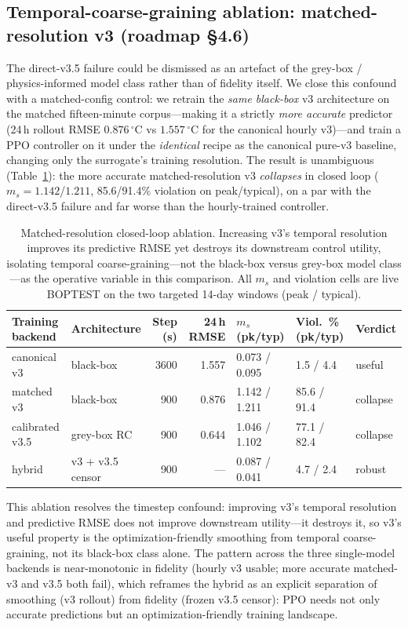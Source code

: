 \documentclass[11pt,a4paper]{article}
\begin{document}
\subsection{Temporal-coarse-graining ablation: matched-resolution v3 (roadmap \S4.6)}
\label{ssec:coarse-graining}

The direct-v3.5 failure could be dismissed as an artefact of the grey-box / physics-informed model class rather than of fidelity itself. We close this confound with a matched-config control: we retrain the \emph{same black-box} v3 architecture on the matched fifteen-minute corpus---making it a strictly \emph{more accurate} predictor (24\,h rollout RMSE $0.876\,^\circ$C vs $1.557\,^\circ$C for the canonical hourly v3)---and train a PPO controller on it under the \emph{identical} recipe as the canonical pure-v3 baseline, changing only the surrogate's training resolution. The result is unambiguous (Table~\ref{tab:coarse_graining}): the more accurate matched-resolution v3 \emph{collapses} in closed loop ($m_s=1.142$/$1.211$, 85.6/91.4\% violation on peak/typical), on a par with the direct-v3.5 failure and far worse than the hourly-trained controller.

\begin{table}[H]
\centering
\caption{Matched-resolution closed-loop ablation. Increasing v3's temporal resolution improves its predictive RMSE yet destroys its downstream control utility, isolating temporal coarse-graining---not the black-box versus grey-box model class---as the operative variable in this comparison. All $m_s$ and violation cells are live BOPTEST on the two targeted 14-day windows (peak / typical).}
\label{tab:coarse_graining}
\small
\begin{tabular}{llrrlll}
\toprule
Training backend & Architecture & Step (s) & 24\,h RMSE & $m_s$ (pk/typ) & Viol.\ \% (pk/typ) & Verdict \\
\midrule
canonical v3 & black-box & 3600 & 1.557 & 0.073 / 0.095 & 1.5 / 4.4 & useful \\
matched v3 & black-box & 900 & 0.876 & 1.142 / 1.211 & 85.6 / 91.4 & collapse \\
calibrated v3.5 & grey-box RC & 900 & 0.644 & 1.046 / 1.102 & 77.1 / 82.4 & collapse \\
hybrid & v3 + v3.5 censor & 900 & --- & 0.087 / 0.041 & 4.7 / 2.4 & robust \\
\bottomrule
\end{tabular}
\end{table}

This ablation resolves the timestep confound: improving v3's temporal resolution and predictive RMSE does not improve downstream utility---it destroys it, so v3's useful property is the optimization-friendly smoothing from temporal coarse-graining, not its black-box class alone. The pattern across the three single-model backends is near-monotonic in fidelity (hourly v3 usable; more accurate matched-v3 and v3.5 both fail), which reframes the hybrid as an explicit separation of smoothing (v3 rollout) from fidelity (frozen v3.5 censor): PPO needs not only accurate predictions but an optimization-friendly training landscape.
\end{document}
